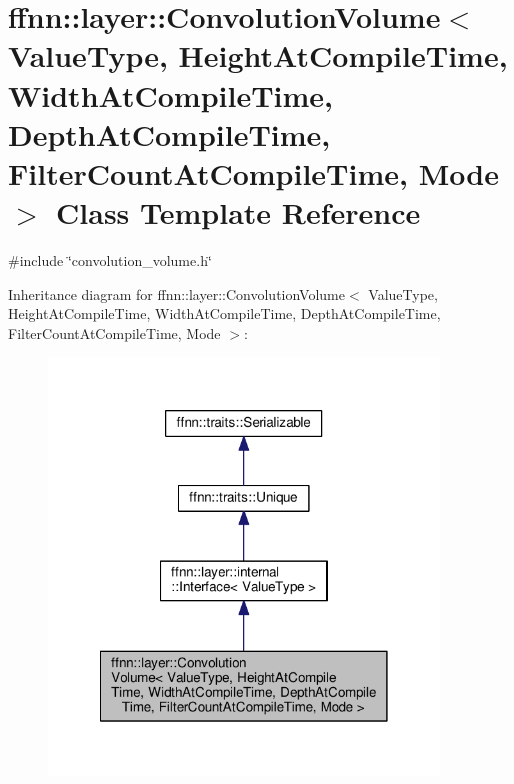 \hypertarget{classffnn_1_1layer_1_1_convolution_volume}{\section{ffnn\-:\-:layer\-:\-:Convolution\-Volume$<$ Value\-Type, Height\-At\-Compile\-Time, Width\-At\-Compile\-Time, Depth\-At\-Compile\-Time, Filter\-Count\-At\-Compile\-Time, Mode $>$ Class Template Reference}
\label{classffnn_1_1layer_1_1_convolution_volume}
}


{\ttfamily \#include \char`\"{}convolution\-\_\-volume.\-h\char`\"{}}



Inheritance diagram for ffnn\-:\-:layer\-:\-:Convolution\-Volume$<$ Value\-Type, Height\-At\-Compile\-Time, Width\-At\-Compile\-Time, Depth\-At\-Compile\-Time, Filter\-Count\-At\-Compile\-Time, Mode $>$\-:\nopagebreak
\begin{figure}[H]
\begin{center}
\leavevmode
\includegraphics[width=294pt]{classffnn_1_1layer_1_1_convolution_volume__inherit__graph}
\end{center}
\end{figure}


